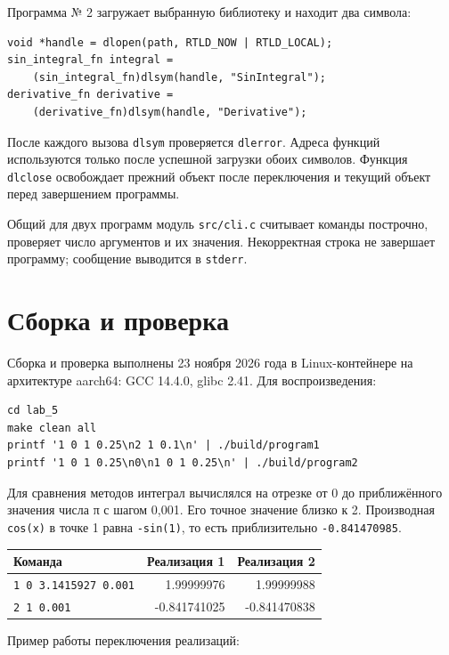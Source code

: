\documentclass[12pt,a4paper]{article}
\begin{document}
Программа № 2 загружает выбранную библиотеку и находит два символа:

\begin{verbatim}
void *handle = dlopen(path, RTLD_NOW | RTLD_LOCAL);
sin_integral_fn integral =
    (sin_integral_fn)dlsym(handle, "SinIntegral");
derivative_fn derivative =
    (derivative_fn)dlsym(handle, "Derivative");
\end{verbatim}

После каждого вызова \texttt{dlsym} проверяется \texttt{dlerror}. Адреса
функций используются только после успешной загрузки обоих символов. Функция
\texttt{dlclose} освобождает прежний объект после переключения и текущий
объект перед завершением программы.

Общий для двух программ модуль \texttt{src/cli.c} считывает команды построчно,
проверяет число аргументов и их значения. Некорректная строка не завершает
программу; сообщение выводится в \texttt{stderr}.

\section{Сборка и проверка}

Сборка и проверка выполнены 23 ноября 2026 года в Linux-контейнере
на архитектуре aarch64: GCC 14.4.0, glibc 2.41. Для воспроизведения:

\begin{verbatim}
cd lab_5
make clean all
printf '1 0 1 0.25\n2 1 0.1\n' | ./build/program1
printf '1 0 1 0.25\n0\n1 0 1 0.25\n' | ./build/program2
\end{verbatim}

Для сравнения методов интеграл вычислялся на отрезке от 0 до приближённого
значения числа π с шагом 0,001. Его точное значение близко к 2. Производная
\texttt{cos(x)} в точке 1 равна \texttt{-sin(1)}, то есть приблизительно
\texttt{-0.841470985}.

\begin{center}
\small
\begin{tabular}{|p{62mm}|r|r|}
\hline
Команда & Реализация 1 & Реализация 2 \\
\hline
\texttt{1 0 3.1415927 0.001} & 1.99999976 & 1.99999988 \\
\hline
\texttt{2 1 0.001} & -0.841741025 & -0.841470838 \\
\hline
\end{tabular}
\end{center}

Пример работы переключения реализаций:
\end{document}
